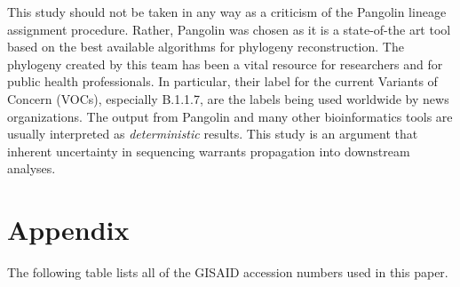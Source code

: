 \documentclass[10pt]{article}
\begin{document}
This study should not be taken in any way as a criticism of the Pangolin lineage assignment procedure.
Rather, Pangolin was chosen as it is a state-of-the art tool based on the best available algorithms for phylogeny reconstruction.
The phylogeny created by this team has been a vital resource for researchers and for public health professionals.
In particular, their label for the current Variants of Concern (VOCs), especially B.1.1.7, are the labels being used worldwide by news organizations.
The output from Pangolin and many other bioinformatics tools are usually interpreted as \emph{deterministic} results.
This study is an argument that inherent uncertainty in sequencing warrants propagation into downstream analyses.



\section*{Appendix}

The following table lists all of the GISAID accession numbers used in this paper.
\end{document}
